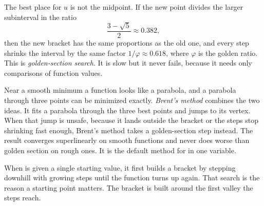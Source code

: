 The best place for \(u\) is not the midpoint. If the new point divides the
larger subinterval in the ratio
\[
  \frac{3 - \sqrt5}{2} \approx 0.382,
\]
then the new bracket has the same proportions as the old one, and every step
shrinks the interval by the same factor \(1/\varphi \approx 0.618\), where
\(\varphi\) is the golden ratio. This is \emph{golden-section
search}. It is slow but it never fails, because it
needs only comparisons of function values.

Near a smooth minimum a function looks like a parabola, and a parabola through
three points can be minimized exactly. \emph{Brent's
method} combines the two ideas. It fits a parabola through
the three best points and jumps to its vertex. When that jump is unsafe, because
it lands outside the bracket or the steps stop shrinking fast enough, Brent's
method takes a golden-section step instead. The result converges superlinearly
on smooth functions and never does worse than golden section on rough ones.
It is the default method for  in one variable.

\begin{codepairs}
\end{codepairs}

When  is given a single starting value, it first builds a
bracket by stepping downhill with growing steps until the function turns up
again. That search is the reason a starting point matters. The bracket is built
around the first valley the steps reach.


